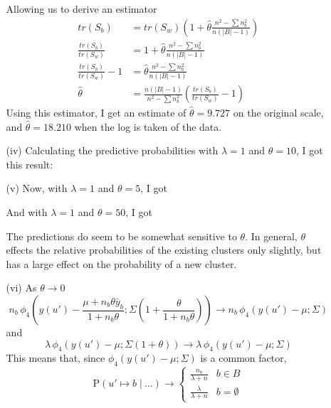 \documentclass[11pt]{article}
\newcommand{\p}{\mathrm{P}}
\newcommand{\st}{ \; \big | \:}
\newcommand{\car}[1]{\left\vert #1 \right\vert}
\theoremstyle{definition}
\begin{document}
\begin{itemize}
\begin{itemize}
                Allowing us to derive an estimator
                \begin{align*}
                    tr(S_b) &= tr(S_w)\left(1+\hat\theta\frac{n^2-\sum n_b^2}{n(\car{B}-1)}\right) \\
                    \frac{tr(S_b)}{tr(S_w)} &=1+\hat\theta\frac{n^2-\sum n_b^2}{n(\car{B}-1)} \\
                    \frac{tr(S_b)}{tr(S_w)}-1 &=\hat\theta\frac{n^2-\sum n_b^2}{n(\car{B}-1)} \\
                    \hat\theta &= \frac{n(\car{B}-1)}{n^2-\sum n_b^2}\left(\frac{tr(S_b)}{tr(S_w)}-1\right) 
                \end{align*}
                Using this estimator, I get an estimate of $\hat\theta = 9.727$ on the original scale, and $\hat\theta = 18.210$ when the log is taken of the data.
            \item[(iv)]
                Calculating the predictive probabilities with $\lambda=1$ and $\theta=10$, I got this result:
                \FloatBarrier
                
                \FloatBarrier
            \item[(v)]
                Now, with $\lambda=1$ and $\theta=5$, I got
                \FloatBarrier
                
                \FloatBarrier
                And with  $\lambda=1$ and $\theta=50$, I got
                \FloatBarrier
                
                \FloatBarrier
            The predictions do seem to be somewhat sensitive to $\theta$. In general, $\theta$ effects the relative probabilities of the existing clusters only slightly, but has a large effect on the probability of a new cluster.
            \item[(vi)]
                As $\theta\to0$
                \[ n_b\, \phi_4\!\left(y(u') - \frac{\mu+n_b\theta \bar y_b}{1+n_b\theta};\Sigma\left(1+\frac{\theta}{1+n_b\theta}\right)\right) \to n_b\, \phi_4\!\left(y(u') - \mu;\Sigma\right) \]
                and 
                \[ \lambda\, \phi_4\!\left(y(u') - \mu;\Sigma\left(1+\theta\right)\right) \to \lambda\, \phi_4\!\left(y(u') - \mu;\Sigma\right) \]
                This means that, since $\phi_4\!\left(y(u') - \mu;\Sigma\right)$ is a common factor,
                \[ \p(u' \mapsto b\st ...) \to \begin{cases} \frac{n_b}{\lambda+n} & b\in B \\
                                                         \frac{\lambda}{\lambda+n} & b = \emptyset 
                                                 \end{cases} \]

\end{itemize}
\end{itemize}
\end{document}
